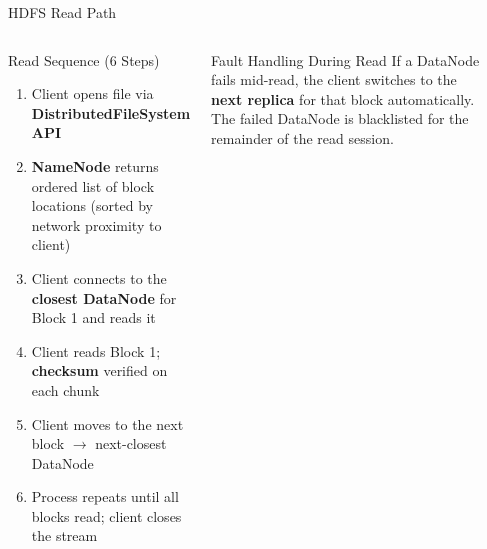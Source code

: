 \documentclass[aspectratio=169,10pt]{beamer}
\begin{document}
\begin{frame}[fragile]{HDFS Read Path}
  \begin{columns}[T]
      \begin{block}{Read Sequence (6 Steps)}
        \begin{enumerate}
          \item Client opens file via \textbf{DistributedFileSystem API}
          \item \textbf{NameNode} returns ordered list of block locations (sorted by network proximity to client)
          \item Client connects to the \textbf{closest DataNode} for Block 1 and reads it
          \item Client reads Block 1; \textbf{checksum} verified on each chunk
          \item Client moves to the next block $\to$ next-closest DataNode
          \item Process repeats until all blocks read; client closes the stream
        \end{enumerate}
      \end{block}
      \vspace{4pt}
      \begin{exampleblock}{Fault Handling During Read}
        If a DataNode fails mid-read, the client switches to the \textbf{next replica} for that block automatically.  The failed DataNode is blacklisted for the remainder of the read session.
      \end{exampleblock}

      \begin{center}
\end{center}
\end{columns}
\end{frame}
\end{document}
